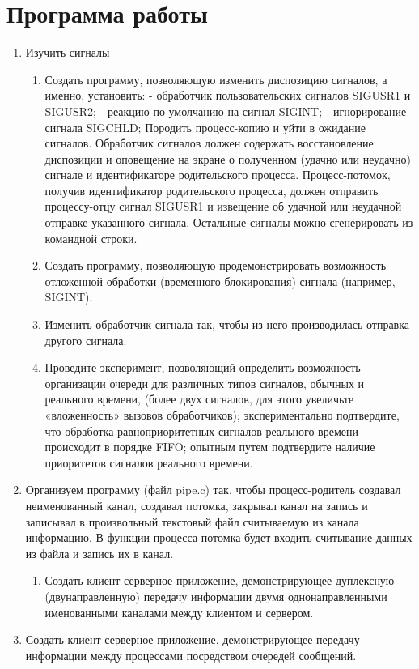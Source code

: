 \documentclass[a4paper]{article}
\begin{document}
\section{Программа работы}
\begin{enumerate}
\item Изучить сигналы
\begin{enumerate}
	\item Создать программу, позволяющую изменить диспозицию сигналов, а именно, установить:
- обработчик пользовательских сигналов SIGUSR1 и SIGUSR2;
- реакцию по умолчанию на сигнал SIGINT;
- игнорирование сигнала SIGCHLD;
Породить процесс-копию и уйти в ожидание сигналов. Обработчик сигналов должен содержать восстановление диспозиции и оповещение на экране о полученном (удачно или неудачно) сигнале и идентификаторе родительского процесса. Процесс-потомок, получив идентификатор родительского процесса, должен отправить процессу-отцу сигнал SIGUSR1 и извещение об удачной или неудачной отправке указанного сигнала. Остальные сигналы можно сгенерировать из командной строки.
	\item Создать программу, позволяющую продемонстрировать возможность отложенной обработки (временного блокирования) сигнала (например, SIGINT).
	\item Изменить обработчик сигнала так, чтобы из него производилась отправка другого сигнала.
	\item Проведите эксперимент, позволяющий определить возможность организации очереди для различных типов сигналов, обычных и реального времени, (более двух сигналов, для этого увеличьте «вложенность» вызовов обработчиков); экспериментально подтвердите, что обработка равноприоритетных сигналов реального времени происходит в порядке FIFO; опытным путем подтвердите наличие приоритетов сигналов реального времени.
\end{enumerate}
\item Организуем программу (файл pipe.c) так, чтобы процесс-родитель создавал неименованный канал, создавал потомка, закрывал канал на запись и записывал в произвольный текстовый файл считываемую из канала информацию. В функции процесса-потомка будет входить считывание данных из файла и запись их в канал.
	\begin{enumerate} \item Создать клиент-серверное приложение, демонстрирующее дуплексную (двунаправленную) передачу информации двумя однонаправленными именованными каналами между клиентом и сервером.
	\end{enumerate}
\item Создать клиент-серверное приложение, демонстрирующее передачу информации между процессами посредством очередей сообщений.

\end{enumerate}
\end{document}
